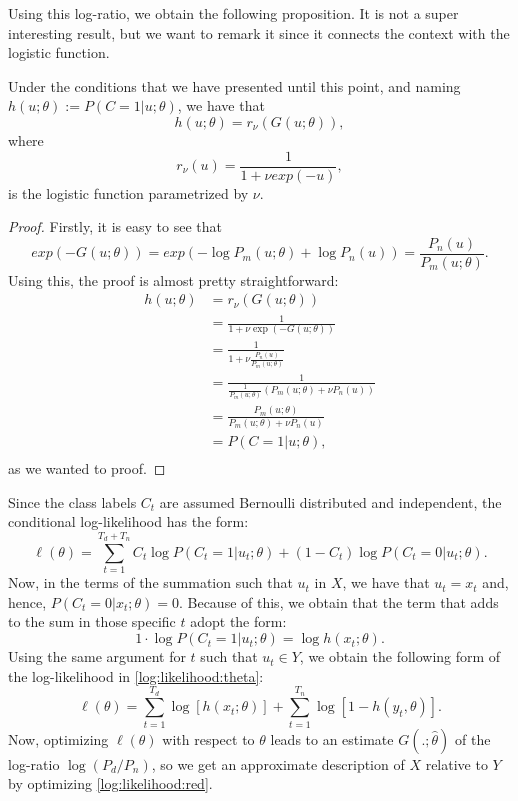 Using this log-ratio, we obtain the following proposition. It is not a super interesting result, but we want to remark it since it connects the context with the logistic function.
\begin{nprop}
Under the conditions that we have presented until this point, and naming $h(u;\theta) := P(C = 1|u ; \theta)$, we have that
\[
h(u;\theta) = r_\nu(G(u;\theta)),
\]
where
\begin{equation}\label{log:func:nu}
r_\nu(u) = \frac{1}{1 + \nu exp(-u)},
\end{equation}
is the logistic function parametrized by $\nu$.
\end{nprop}
\begin{proof}
Firstly, it is easy to see that
\[
exp(-G(u;\theta)) = exp(- \log P_m(u;\theta) + \log P_n(u)) = \frac{P_n(u)}{P_m(u;\theta)}.    
\]
Using this, the proof is almost pretty straightforward:
\begin{align*}
h(u;\theta) & = r_\nu(G(u;\theta)) \\
& = \frac{1}{1 + \nu \exp(- G(u;\theta))} \\
& = \frac{1}{1 + \nu \frac{P_n(u)}{P_m(u;\theta)}}\\
& = \frac{1}{\frac{1}{P_m(u;\theta)} \left( P_m(u;\theta) + \nu P_n(u)\right)} \\
& = \frac{P_m(u;\theta)}{P_m(u;\theta) + \nu P_n(u)}\\
& = P(C = 1|u; \theta),\\
\end{align*}
as we wanted to proof.
\end{proof}
Since the class labels $C_t$ are assumed Bernoulli distributed and independent, the conditional log-likelihood has the form:
\begin{equation}\label{log:likelihood:theta}
\ell(\theta)  = \sum_{t = 1}^{T_d + T_n} C_t \log P(C_t = 1|u_t; \theta) + (1-C_t) \log P(C_t = 0|u_t;\theta).
\end{equation}
Now, in the terms of the summation such that $u_t$ in $X$, we have that  $u_t = x_t$ and, hence,  $P(C_t = 0|x_t;\theta) = 0$. Because of this, we obtain that the term that adds to the sum in those specific $t$ adopt the form:
\[
1\cdot \log P(C_t = 1|u_t;\theta) = \log h(x_t;\theta).
\]
Using the same argument for $t$ such that $u_t \in Y$, we obtain the following form of the log-likelihood in \eqref{log:likelihood:theta}:
\begin{equation}\label{log:likelihood:red}
\ell(\theta) = \sum_{t = 1}^{T_d} \log [h(x_t;\theta)] + \sum_{t = 1}^{T_n} \log[1- h(y_t,\theta)].
\end{equation}
Now, optimizing $\ell(\theta)$ with respect to $\theta$ leads to an estimate $G(.;\hat{\theta})$ of the log-ratio $\log (P_d/P_n)$, so we get an approximate description of $X$ relative to $Y$ by optimizing \eqref{log:likelihood:red}.

